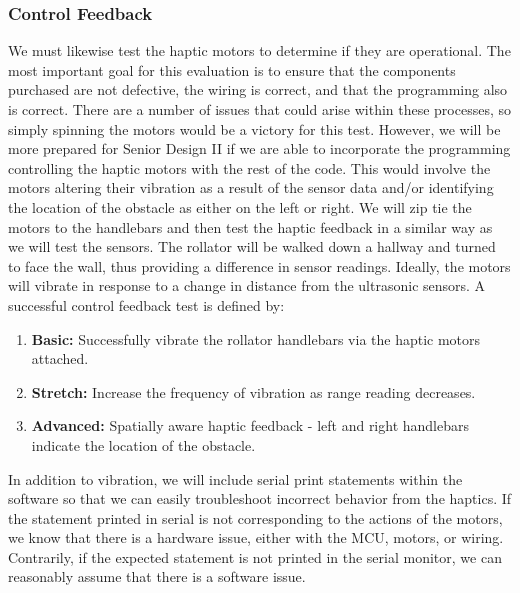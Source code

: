 \subsubsection{Control Feedback}
\noindent We must likewise test the haptic motors to determine if they are operational. The most important goal for this evaluation is to ensure that the components purchased are not defective, the wiring is correct, and that the programming also is correct. There are a number of issues that could arise within these processes, so simply spinning the motors would be a victory for this test. However, we will be more prepared for Senior Design II if we are able to incorporate the programming controlling the haptic motors with the rest of the code. This would involve the motors altering their vibration as a result of the sensor data and/or identifying the location of the obstacle as either on the left or right. We will zip tie the motors to the handlebars and then test the haptic feedback in a similar way as we will test the sensors. The rollator will be walked down a hallway and turned to face the wall, thus providing a difference in sensor readings. Ideally, the motors will vibrate in response to a change in distance from the ultrasonic sensors. A successful control feedback test is defined by:

\begin{enumerate}
	\item \textbf{Basic:} Successfully vibrate the rollator handlebars via the haptic motors attached.
	\item \textbf{Stretch:} Increase the frequency of vibration as range reading decreases.
	\item \textbf{Advanced:} Spatially aware haptic feedback - left and right handlebars indicate the location of the obstacle.
\end{enumerate}

 
 \noindent In addition to vibration, we will include serial print statements within the software so that we can easily troubleshoot incorrect behavior from the haptics. If the statement printed in serial is not corresponding to the actions of the motors, we know that there is a hardware issue, either with the MCU, motors, or wiring. Contrarily, if the expected statement is not printed in the serial monitor, we can reasonably assume that there is a software issue.\\


